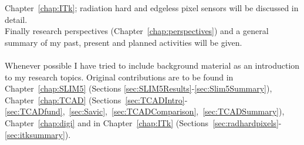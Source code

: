 Chapter~\ref{chap:ITk}; radiation hard and edgeless pixel sensors will be discussed in detail. 
\\ Finally research perspectives (Chapter~\ref{chap:perspectives}) and a general summary of my past, present 
and planned activities will be given.
\\
\\
Whenever possible I have tried to include background material as an introduction to my research topics. 
Original contributions are to be found in Chapter~\ref{chap:SLIM5} (Sections \ref{sec:SLIM5Results}-\ref{sec:Slim5Summary}), Chapter~\ref{chap:TCAD} (Sections~\ref{sec:TCADIntro}-\ref{sec:TCADfund},~\ref{sec:Savic},~\ref{sec:TCADComparison},~\ref{sec:TCADSummary}), Chapter~\ref{chap:digi} and in 
Chapter~\ref{chap:ITk} (Sections~\ref{sec:radhardpixels}-\ref{sec:itksummary}).



